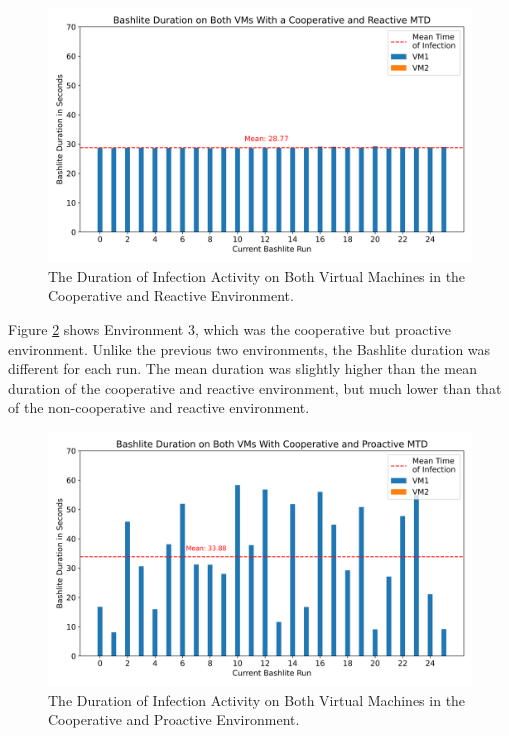 \begin{figure}[tph]
\includegraphics[scale=0.6]{assets/bashliteDurationCoopAndReactive.png}
\centering
\caption{The Duration of Infection Activity on Both Virtual Machines in the Cooperative and Reactive Environment.}
\label{graphic:bashliteDurationCoopAndReactive}
\end{figure}


Figure \ref{graphic:bashliteDurationCoopAndProactive} shows Environment 3, which was the cooperative but proactive environment. Unlike the previous two environments, the Bashlite duration was different for each run. The mean duration was slightly higher than the mean duration of the cooperative and reactive environment, but much lower than that of the non-cooperative and reactive environment.   





\begin{figure}[tph]
\includegraphics[scale=0.6]{assets/bashliteDurationCoopAndProactive.png}
\centering
\caption{The Duration of Infection Activity on Both Virtual Machines in the Cooperative and Proactive Environment.}
\label{graphic:bashliteDurationCoopAndProactive}
\end{figure}


